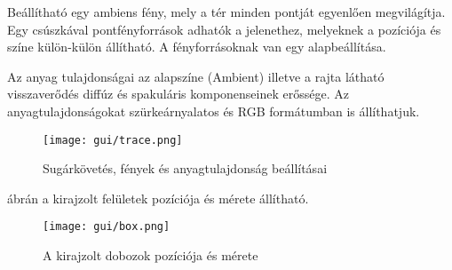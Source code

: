 Beállítható egy ambiens fény, mely a tér minden pontját egyenlően megvilágítja. Egy csúszkával pontfényforrások adhatók a jelenethez, melyeknek a pozíciója és színe külön-külön állítható. A fényforrásoknak van egy alapbeállítása.

Az anyag tulajdonságai az alapszíne (Ambient) illetve a rajta látható visszaverődés diffúz és spakuláris komponenseinek erőssége. Az anyagtulajdonságokat szürkeárnyalatos és RGB formátumban is állíthatjuk.

\begin{figure}[H]
	\centering
	\texttt{[image: gui/trace.png]}
	\caption{Sugárkövetés, fények és anyagtulajdonság beállításai}
	\label{fig:trace-settings}
\end{figure}

 ábrán a kirajzolt felületek pozíciója és mérete állítható.

\begin{figure}[H]
	\centering
	\texttt{[image: gui/box.png]}
	\caption{A kirajzolt dobozok pozíciója és mérete}
	\label{fig:box-settings}
\end{figure}




